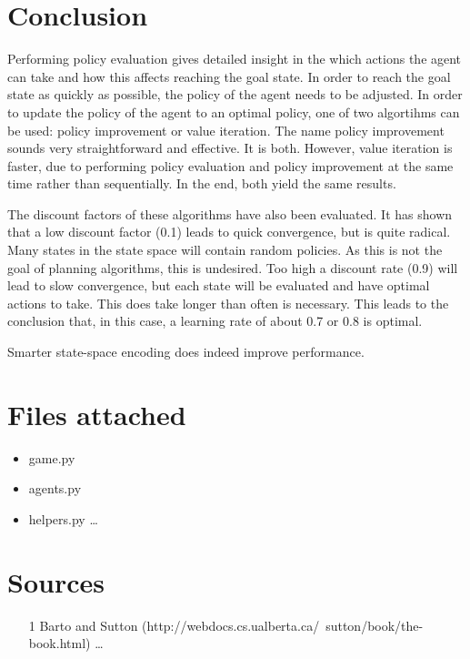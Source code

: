 \documentclass{article}
\begin{document}
\section*{Conclusion}
Performing policy evaluation gives detailed insight in the which actions the agent can take and how this affects reaching the goal state. In order to reach the goal state as quickly as possible, the policy of the agent needs to be adjusted. In order to update the policy of the agent to an optimal policy, one of two algortihms can be used: policy improvement or value iteration. The name policy improvement sounds very straightforward and effective. It is both. However, value iteration is faster, due to performing policy evaluation and policy improvement at the same time rather than sequentially. In the end, both yield the same results.

The discount factors of these algorithms have also been evaluated. It has shown that a low discount factor (0.1) leads to quick convergence, but is quite radical. Many states in the state space will contain random policies. As this is not the goal of planning algorithms, this is undesired. Too high a discount rate (0.9) will lead to slow convergence, but each state will be evaluated and have optimal actions to take. This does take longer than often is necessary. This leads to the conclusion that, in this case, a learning rate of about 0.7 or 0.8 is optimal.

Smarter state-space encoding does indeed improve performance.



\section*{Files attached}
\begin{itemize}
\item game.py
\item agents.py
\item helpers.py \ldots
\end{itemize}
\section*{Sources}

\begin{itemize}
	\item [1] Barto and Sutton (http://webdocs.cs.ualberta.ca/~sutton/book/the-book.html) \ldots
\end{itemize}
\end{document}
